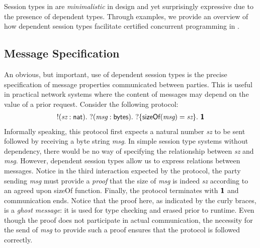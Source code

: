Session types in \TLLC{} are \emph{minimalistic} in design and yet surprisingly expressive
due to the presence of dependent types. Through examples, we provide an overview of
how dependent session types facilitate certified concurrent programming in \TLLC{}.

\subsection{Message Specification}\label{sec:message-specification}
An obvious, but important, use of dependent session types is the precise specification
of message properties communicated between parties. This is useful in practical network
systems where the content of messages may depend on the value of a prior request.
Consider the following protocol:
\begin{align*}
  !(\textit{sz}: \textsf{nat}).\
  ?(\textit{msg}: \textsf{bytes}).\ ?\{\textsf{sizeOf}(\textit{msg}) = \textit{sz}\}.\ \textbf{\textsf{1}}
\end{align*}
Informally speaking, this protocol first expects a natural number \textit{sz} to be sent
followed by receiving a byte string \textit{msg}. In simple session type systems without
dependency, there would be no way of specifying the relationship between \textit{sz} and
\textit{msg}. However, dependent session types allow us to express relations between messages.
Notice in the third interaction expected by the protocol, the party sending \textit{msg} must
provide a \emph{proof} that the size of \textit{msg} is indeed \textit{sz} according to
an agreed upon \textsf{sizeOf} function. Finally, the protocol terminates with $\textbf{\textsf{1}}$ and
communication ends. Notice that the proof here, as indicated by the curly braces, is a
\emph{ghost message}: it is used for type checking and erased prior to runtime. Even though
the proof does not participate in actual communication, the necessity for the send of
\textit{msg} to provide such a proof ensures that the protocol is followed correctly.

